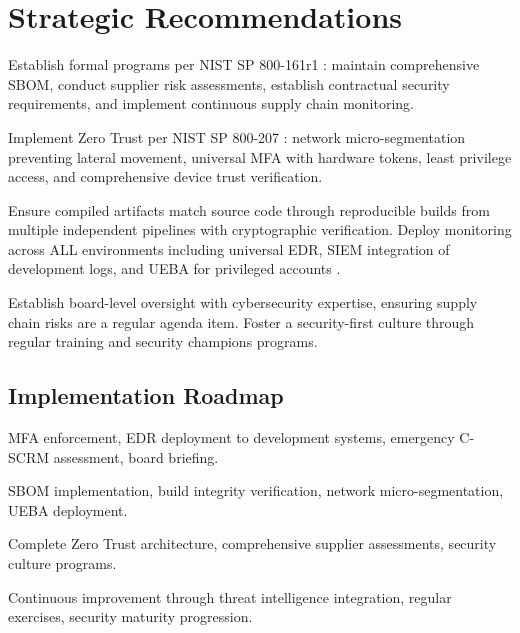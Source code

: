 \section{Strategic Recommendations}

 Establish formal programs per NIST SP 800-161r1 \cite{boyens2024}: maintain comprehensive SBOM, conduct supplier risk assessments, establish contractual security requirements, and implement continuous supply chain monitoring.

 Implement Zero Trust per NIST SP 800-207 \cite{rose2020}: network micro-segmentation preventing lateral movement, universal MFA with hardware tokens, least privilege access, and comprehensive device trust verification.

 Ensure compiled artifacts match source code through reproducible builds from multiple independent pipelines with cryptographic verification. Deploy monitoring across ALL environments including universal EDR, SIEM integration of development logs, and UEBA for privileged accounts \cite{litan2015}.

 Establish board-level oversight with cybersecurity expertise, ensuring supply chain risks are a regular agenda item. Foster a security-first culture through regular training and security champions programs.

\subsection{Implementation Roadmap}

 MFA enforcement, EDR deployment to development systems, emergency C-SCRM assessment, board briefing.

 SBOM implementation, build integrity verification, network micro-segmentation, UEBA deployment.

 Complete Zero Trust architecture, comprehensive supplier assessments, security culture programs.

 Continuous improvement through threat intelligence integration, regular exercises, security maturity progression.
